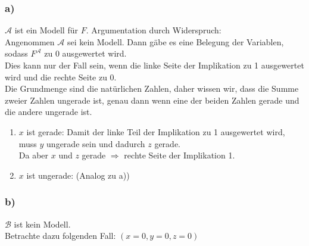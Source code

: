 \documentclass[a4paper,12pt]{article}
\begin{document}
	\subsubsection*{a)}
	$\mathcal{A}$ ist ein Modell für $F$. Argumentation durch Widerspruch:\\
	
	Angenommen $\mathcal{A}$ sei kein Modell. Dann gäbe es eine Belegung der Variablen, sodass $F^{\mathcal{A}}$ zu 0 ausgewertet wird.\\
	Dies kann nur der Fall sein, wenn die linke Seite der Implikation zu 1 ausgewertet wird und die rechte Seite zu 0.\\
	Die Grundmenge sind die natürlichen Zahlen, daher wissen wir, dass die Summe zweier Zahlen ungerade ist, genau dann wenn eine der beiden Zahlen gerade und die andere ungerade ist.
	\begin{enumerate}[1.]
		\item $x$ ist gerade: Damit der linke Teil der Implikation zu 1 ausgewertet wird, muss $y$ ungerade sein und dadurch $z$ gerade.\\
		Da aber $x$ und $z$ gerade $\Rightarrow$ rechte Seite der Implikation 1.
		\item $x$ ist ungerade: (Analog zu a)) 
	\end{enumerate}

	\subsubsection*{b)}
	$\mathcal{B}$ ist kein Modell.\\
	
	Betrachte dazu folgenden Fall: $\left(x=0, y=0, z=0\right)$
	
\end{document}
